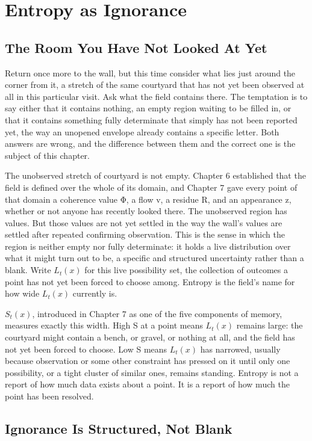 \chapter{Entropy as Ignorance}

\section{The Room You Have Not Looked At Yet}

Return once more to the wall, but this time consider what lies just around the corner from it, a stretch of the same courtyard that has not yet been observed at all in this particular visit. Ask what the field contains there. The temptation is to say either that it contains nothing, an empty region waiting to be filled in, or that it contains something fully determinate that simply has not been reported yet, the way an unopened envelope already contains a specific letter. Both answers are wrong, and the difference between them and the correct one is the subject of this chapter.

The unobserved stretch of courtyard is not empty. Chapter 6 established that the field is defined over the whole of its domain, and Chapter 7 gave every point of that domain a coherence value Φ, a flow v, a residue R, and an appearance z, whether or not anyone has recently looked there. The unobserved region has values. But those values are not yet settled in the way the wall's values are settled after repeated confirming observation. This is the sense in which the region is neither empty nor fully determinate: it holds a live distribution over what it might turn out to be, a specific and structured uncertainty rather than a blank. Write \(L_t(x)\) for this live possibility set, the collection of outcomes a point has not yet been forced to choose among. Entropy is the field's name for how wide \(L_t(x)\) currently is.

\(S_t(x)\), introduced in Chapter 7 as one of the five components of memory, measures exactly this width. High S at a point means \(L_t(x)\) remains large: the courtyard might contain a bench, or gravel, or nothing at all, and the field has not yet been forced to choose. Low S means \(L_t(x)\) has narrowed, usually because observation or some other constraint has pressed on it until only one possibility, or a tight cluster of similar ones, remains standing. Entropy is not a report of how much data exists about a point. It is a report of how much the point has been resolved.

\section{Ignorance Is Structured, Not Blank}

